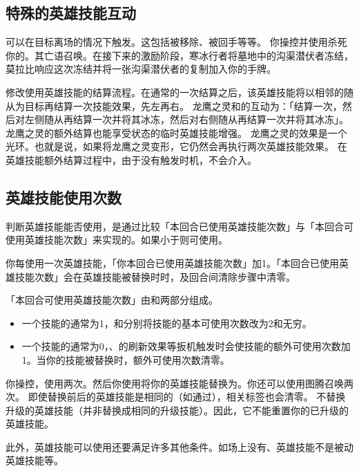 \subsection{特殊的英雄技能互动}

可以在目标离场的情况下触发。这包括被移除、被回手等等。
\example 你操控并使用杀死你的。其亡语召唤。在接下来的激励阶段，寒冰行者将墓地中的沟渠潜伏者冻结，莫拉比响应这次冻结并将一张沟渠潜伏者的复制加入你的手牌。

修改使用英雄技能的结算流程。在通常的一次结算之后，该英雄技能将以相邻的随从为目标再结算一次技能效果，先左再右。
\notice 龙鹰之灵和的互动为：「结算一次，然后对左侧随从再结算一次并将其冰冻，然后对右侧随从再结算一次并将其冰冻」。
\notice 龙鹰之灵的额外结算也能享受状态的临时英雄技能增强。
\notice 龙鹰之灵的效果是一个光环。也就是说，如果将龙鹰之灵变形，它仍然会再执行两次英雄技能效果。
\notice 在英雄技能额外结算过程中，由于没有触发时机，不会介入。

\subsection{英雄技能使用次数}

判断英雄技能能否使用，是通过比较「本回合已使用英雄技能次数」与「本回合可使用英雄技能次数」来实现的。如果小于则可使用。

你每使用一次英雄技能，「你本回合已使用英雄技能次数」加1。「本回合已使用英雄技能次数」会在英雄技能被替换时时，及回合间清除步骤中清零。

「本回合可使用英雄技能次数」由和两部分组成。
\begin{itemize}
    \item 一个技能的通常为1，和分别将技能的基本可使用次数改为2和无穷。
    \item 一个技能的通常为0，、的刷新效果等扳机触发时会使技能的额外可使用次数加1。当你的技能被替换时，额外可使用次数清零。
\end{itemize}
\example 你操控，使用两次。然后你使用将你的英雄技能替换为。你还可以使用图腾召唤两次。
\notice 即使替换前后的英雄技能是相同的（如通过），相关标签也会清零。
\notice {}不替换升级的英雄技能（并非替换成相同的升级技能）。因此，它不能重置你的已升级的英雄技能。

此外，英雄技能可以使用还要满足许多其他条件。如场上没有、英雄技能不是被动英雄技能等。